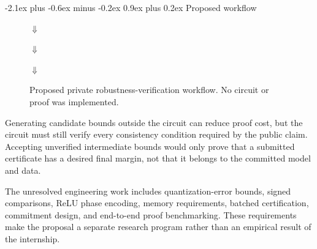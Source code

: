 \documentclass[11pt,a4paper]{article}
\makeatletter
\renewcommand\subsection{\@startsection{subsection}{2}{0pt}
  {-2.1ex plus -0.6ex minus -0.2ex}
  {0.9ex plus 0.2ex}
  {\normalfont\normalsize\bfseries\color{researchnavy}}}
\makeatother
\begin{document}
\subsection{Proposed workflow}

\begin{figure}[H]
\centering
{}

\vspace{0.14cm}
\(\Downarrow\)
\vspace{0.14cm}


\vspace{0.14cm}
\(\Downarrow\)
\vspace{0.14cm}


\vspace{0.14cm}
\(\Downarrow\)
\vspace{0.14cm}

\caption{Proposed private robustness-verification workflow. No circuit or proof was implemented.}
\label{fig:zk}
\end{figure}

Generating candidate bounds outside the circuit can reduce proof cost, but the circuit must still verify every consistency condition required by the public claim. Accepting unverified intermediate bounds would only prove that a submitted certificate has a desired final margin, not that it belongs to the committed model and data.

The unresolved engineering work includes quantization-error bounds, signed comparisons, ReLU phase encoding, memory requirements, batched certification, commitment design, and end-to-end proof benchmarking. These requirements make the proposal a separate research program rather than an empirical result of the internship.
\end{document}
